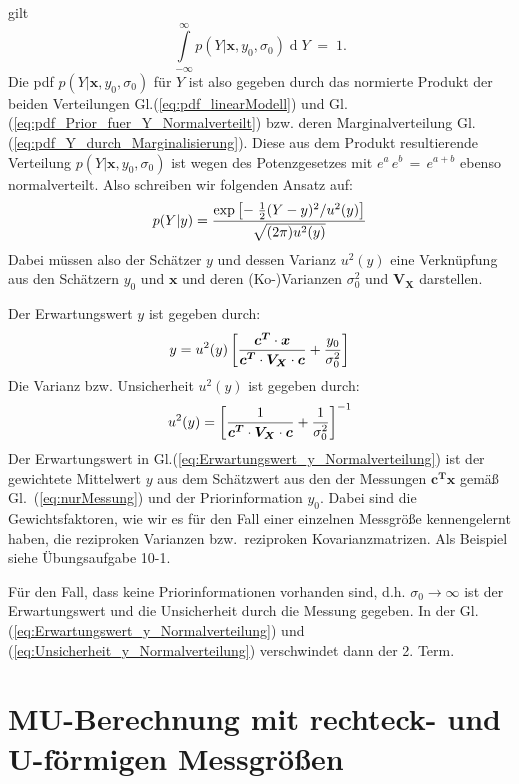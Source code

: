 gilt
$$
\int\limits_{-\infty}^{\infty} p(Y | \boldsymbol{x}, y_0, \sigma_0)
\operatorname{d}Y \; = \; 1 .
$$
Die pdf $p(Y | \boldsymbol{x}, y_0, \sigma_0)$ für $Y$ ist also gegeben durch das normierte
Produkt der beiden Verteilungen Gl.(\ref{eq:pdf_linearModell}) und
Gl.(\ref{eq:pdf_Prior_fuer_Y_Normalverteilt})
bzw. deren Marginalverteilung Gl.(\ref{eq:pdf_Y_durch_Marginalisierung}).
Diese aus dem Produkt resultierende Verteilung $p(Y | \boldsymbol{x}, y_0, \sigma_0)$ ist
wegen des Potenzgesetzes mit $e^a \, e^b \, = \, e^{a+b}$ ebenso normalverteilt. Also
schreiben wir folgenden Ansatz auf:
\begin{equation}
p(Y| y) =  \frac{\textstyle \exp \left[- \; \frac{1}{2} (Y - y)^2/u^2(y) \right]}{\textstyle \sqrt{(2 \pi) u^2(y)}}
\end{equation}
Dabei müssen also der Schätzer $y$ und dessen Varianz $u^2(y)$ eine Verknüpfung aus
den Schätzern $y_0$ und $\boldsymbol{x}$ und deren (Ko-)Varianzen $\sigma_0^2$ und
$\boldsymbol{V_X}$ darstellen.

Der Erwartungswert $y$ ist gegeben durch:
\begin{equation}
y = u^2(y) \left[\frac{\textstyle \boldsymbol{c^T} \cdot \boldsymbol{x}}
{\textstyle \boldsymbol{c^T}\cdot\boldsymbol{V_X} \cdot \boldsymbol{c}} +
\frac{\textstyle y_0}{\textstyle \sigma_0^2} \right]
\label{eq:Erwartungswert_y_Normalverteilung}
\end{equation}
Die Varianz bzw. Unsicherheit $u^2(y)$ ist gegeben durch:
\begin{equation}
u^2(y) =  \left[\frac{1}
{\textstyle \boldsymbol{c^T}\cdot\boldsymbol{V_X} \cdot \boldsymbol{c}} +
\frac{\textstyle 1}{\textstyle \sigma_0^2} \right]^{-1}
\label{eq:Unsicherheit_y_Normalverteilung}
\end{equation}
Der Erwartungswert in Gl.(\ref{eq:Erwartungswert_y_Normalverteilung})
ist der gewichtete Mittelwert $y$ aus dem Schätzwert aus den
der Messungen $\boldsymbol{c^T}\boldsymbol{x}$ gemäß Gl.~(\ref{eq:nurMessung}) und
der Priorinformation $y_0$. Dabei sind die Gewichtsfaktoren, wie wir es
für den Fall einer einzelnen Messgröße kennengelernt haben, die reziproken
Varianzen bzw.\ reziproken Kovarianzmatrizen. Als Beispiel siehe Übungsaufgabe 10-1.

Für den Fall, dass keine Priorinformationen vorhanden sind, d.h.
$\sigma_0 \rightarrow \infty$ ist der Erwartungswert und die Unsicherheit durch die Messung gegeben.
In der Gl. (\ref{eq:Erwartungswert_y_Normalverteilung}) und (\ref{eq:Unsicherheit_y_Normalverteilung}) verschwindet dann der 2. Term.
\section{MU-Berechnung mit rechteck- und U-förmigen Messgrößen}
